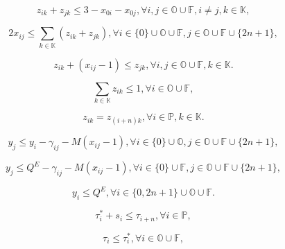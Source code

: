 \documentclass[10pt]{article}
\begin{document}
\begin{equation}
    \label{eq:9}
    z_{ik} + z_{jk} \le 3 - x_{0i} - x_{0j}, \forall i, j \in \mathbb{O} \cup \mathbb{F}, i\ne j, k \in \mathbb{K}, \tag{9}
\end{equation}

\begin{equation}
    \label{eq:10}
    2x_{ij} \le \sum_{k \in \mathbb{K}} (z_{ik} + z_{jk}), \forall i \in \{0\} \cup \mathbb{O} \cup \mathbb{F}, j \in \mathbb{O} \cup \mathbb{F} \cup \{2n + 1\}, \tag{10}
\end{equation}

\begin{equation}
    \label{eq:11}
    z_{ik} + (x_{ij} - 1) \le z_{jk}, \forall i, j \in \mathbb{O} \cup \mathbb{F}, k \in \mathbb{K}. \tag{11}
\end{equation}

\begin{equation}
    \label{eq:12}
    \sum_{k \in \mathbb{K}} z_{ik} \le 1, \forall i \in \mathbb{O} \cup \mathbb{F}, \tag{12}
\end{equation}

\begin{equation}
    \label{eq:13}
    z_{ik} = z_{(i+n)k}, \forall i \in \mathbb{P}, k \in \mathbb{K}. \tag{13}
\end{equation}

\begin{equation}
    \label{eq:14}
    y_j \le y_i - \gamma_{ij} - M(x_{ij} - 1), \forall i \in \{0\} \cup \mathbb{O}, j \in \mathbb{O} \cup \mathbb{F} \cup \{2n + 1\}, \tag{14}
\end{equation}

\begin{equation}
    \label{eq:15}
    y_j \le Q^E - \gamma_{ij} - M(x_{ij} - 1), \forall i \in \{0\} \cup \mathbb{F}, j \in \mathbb{O} \cup \mathbb{F} \cup \{2n + 1\}, \tag{15}
\end{equation}

\begin{equation}
    \label{eq:16}
    y_i \le Q^E, \forall i \in \{0, 2n + 1\} \cup \mathbb{O} \cup \mathbb{F}. \tag{16}
\end{equation}

\begin{equation}
    \label{eq:17}
    \tau_i^* + s_i \le \tau_{i+n}, \forall i \in \mathbb{P}, \tag{17}
\end{equation}

\begin{equation}
    \label{eq:18}
    \tau_i \le \tau_i^*, \forall i \in \mathbb{O} \cup \mathbb{F}, \tag{18}
\end{equation}
\end{document}
